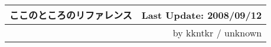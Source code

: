 \documentclass[10pt]{jsarticle}
\newcommand{\mymaketitle}[3]%
 {\begin{center}\begin{tabular}{lr}\textsf{\huge #1}\hspace{3.5cm}\mbox{}&#3\\\hline&#2\end{tabular}\end{center}}
\begin{document}
\mymaketitle{ここのところのリファレンス}{by kkntkr / unknown}%
{Last Update: 2008/09/12}



\begin{multicols}{2}








%


\end{multicols}
\end{document}
